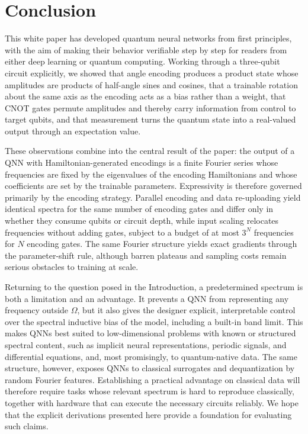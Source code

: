 \documentclass[12pt]{article}
\numberwithin{equation}{section}  %
\begin{document}
\section{Conclusion}
\label{sec:conclusion}

This white paper has developed quantum neural networks from first principles, with the aim of making their behavior verifiable step by step for readers from either deep learning or quantum computing. Working through a three-qubit circuit explicitly, we showed that angle encoding produces a product state whose amplitudes are products of half-angle sines and cosines, that a trainable rotation about the same axis as the encoding acts as a bias rather than a weight, that CNOT gates permute amplitudes and thereby carry information from control to target qubits, and that measurement turns the quantum state into a real-valued output through an expectation value.

These observations combine into the central result of the paper: the output of a QNN with Hamiltonian-generated encodings is a finite Fourier series whose frequencies are fixed by the eigenvalues of the encoding Hamiltonians and whose coefficients are set by the trainable parameters. Expressivity is therefore governed primarily by the encoding strategy. Parallel encoding and data re-uploading yield identical spectra for the same number of encoding gates and differ only in whether they consume qubits or circuit depth, while input scaling relocates frequencies without adding gates, subject to a budget of at most $3^N$ frequencies for $N$ encoding gates. The same Fourier structure yields exact gradients through the parameter-shift rule, although barren plateaus and sampling costs remain serious obstacles to training at scale.

Returning to the question posed in the Introduction, a predetermined spectrum is both a limitation and an advantage. It prevents a QNN from representing any frequency outside $\Omega$, but it also gives the designer explicit, interpretable control over the spectral inductive bias of the model, including a built-in band limit. This makes QNNs best suited to low-dimensional problems with known or structured spectral content, such as implicit neural representations, periodic signals, and differential equations, and, most promisingly, to quantum-native data. The same structure, however, exposes QNNs to classical surrogates and dequantization by random Fourier features. Establishing a practical advantage on classical data will therefore require tasks whose relevant spectrum is hard to reproduce classically, together with hardware that can execute the necessary circuits reliably. We hope that the explicit derivations presented here provide a foundation for evaluating such claims.



\end{document}
